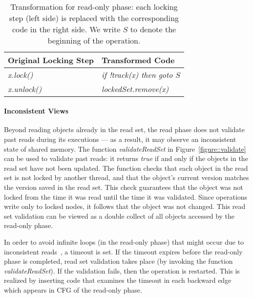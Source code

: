\begin{table}
\scriptsize
\ttfamily
{\tt
\begin{center}
\begin{tabular}{|l|l|}
\hline
\textbf{Original Locking Step} & \textbf{Transformed Code}\\
\hline
\textit{x.lock()}&
\textit{if !track(x) then goto $S$}
\\
\hline
\textit{x.unlock()}&
\textit{lockedSet.remove(x)}
\\
\hline
\end{tabular}
\end{center}
}
\caption{Transformation for read-only phase:
each locking step (left side) is replaced with the corresponding code in the right side.
We write $S$ to denote the beginning of the operation.
}
\label{Ta:readOnlyTransformation}
\end{table}

\paragraph{Inconsistent Views}
Beyond reading objects already in the read set, the read phase does not validate past reads during its executions ---
as a result, it may observe an inconsistent state of shared memory.
%
The function \emph{validateReadSet} in Figure~\ref{figure::validate} can be used to validate past reads: it returns \emph{true} if and only if the objects in the read set have not been updated.
%
The function checks that each object in the read set is not locked by another thread,
and that the object's current version matches the version saved in the
read set.
This check guarantees that the object was not locked from the time it was read until
the time it was validated.
Since operations write only to
locked nodes, it follows that the object was not changed.
This read set validation can be viewed as a double collect
of all objects accessed by the read-only phase.

In order to avoid infinite loops (in the read-only phase) that might occur due to inconsistent reads~\cite{xxx}, a timeout is set.
If the timeout expires before the read-only phase is completed, read set
validation takes place (by invoking the function \emph{validateReadSet}). If the validation fails, then the operation is restarted.
This is realized by inserting code that examines the timeout in each backward edge which appears in CFG of the read-only phase.



